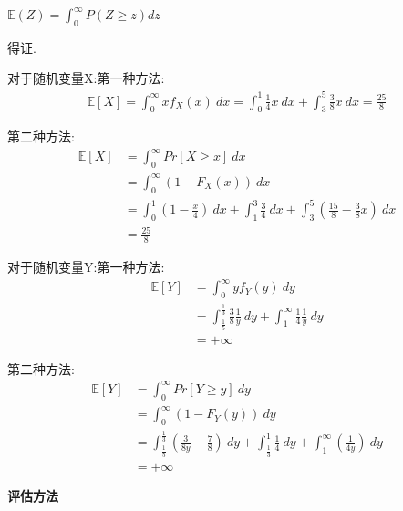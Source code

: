 \documentclass[answers]{exam}  %
\begin{document}
\begin{questions}
\begin{solution}
        $\mathbb E(Z)=\int_0^\infty P(Z\geq z)dz$

        得证.

        对于随机变量X:第一种方法:
        \begin{align*}
            \mathbb E[X]=\int_0^\infty xf_X(x)\ dx=\int_0^1\frac{1}{4} x\ dx+\int_3^5 \frac{3}{8} x\ dx=\frac{25}{8}
        \end{align*}

        第二种方法:
        \begin{align*}
            \mathbb E[X] & =\int_0^\infty Pr[X\geq x]\ dx \\&=\int_0^\infty(1-F_X(x))\ dx\\&=\int_0^1(1-\frac{x}{4} )\ dx+\int_1^3 \frac{3}{4} \ dx+\int_3^5(\frac{15}{8} -\frac{3}{8}x) \ dx \\& =\frac{25}{8}
        \end{align*}

        对于随机变量Y:第一种方法:
        \begin{align*}
            \mathbb E[Y] & =\int_0^\infty yf_Y(y)\ dy \\&=\int_{\frac{1}{5} }^{\frac{1}{3} }\frac{3}{8} \frac{1}{y} \ dy+\int_1^\infty \frac{1}{4} \frac{1}{y} \ dy\\&=+\infty
        \end{align*}

        第二种方法:
        \begin{align*}
            \mathbb E[Y] & =\int_0^\infty Pr[Y\geq y]\ dy \\&=\int_0^\infty(1-F_Y(y))\ dy\\&=\int_{\frac{1}{5} }^{\frac{1}{3} }(\frac{3}{8y} -\frac{7}{8} )\ dy+\int_{\frac{1}{3} }^1 \frac{1}{4} \ dy+\int_1^\infty(\frac{1}{4y}) \ dy \\& =+\infty
        \end{align*}
    \end{solution}


    \question [40] \textbf{评估方法}


\end{questions}
\end{document}
